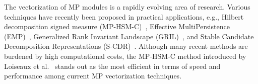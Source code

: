 The vectorization of MP modules is a rapidly evolving area of research. Various techniques have recently been proposed in practical applications, e.g.,  Hilbert decomposition signed measure (MP-HSM-C)~\cite{loiseaux2024stable}, Effective MultiPersistence (EMP)~\cite{chen2024emp}, Generalized Rank Invariant Landscape (GRIL)~\cite{xin2023gril}, and Stable Candidate Decomposition Representations (S-CDR)~\cite{loiseaux2024framework}. Although many recent methods are burdened by high computational costs, the MP-HSM-C method introduced by Loiseaux et al.~\cite{loiseaux2024stable} stands out as the most efficient in terms of speed and performance among current MP vectorization techniques.
 




